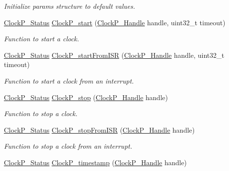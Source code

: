 \begin{DoxyCompactItemize}
\begin{DoxyCompactList}\small\item\em Initialize params structure to default values. \end{DoxyCompactList}\item 
\hyperlink{_clock_p_8h_aa2030f172fe0c2dbc9ac0b082933c767}{Clock\+P\+\_\+\+Status} \hyperlink{_clock_p_8h_a72fe821307efbdb0e314108857e39e56}{Clock\+P\+\_\+start} (\hyperlink{_clock_p_8h_a003dd74e948999fe5c3f45d8f51501f1}{Clock\+P\+\_\+\+Handle} handle, uint32\+\_\+t timeout)
\begin{DoxyCompactList}\small\item\em Function to start a clock. \end{DoxyCompactList}\item 
\hyperlink{_clock_p_8h_aa2030f172fe0c2dbc9ac0b082933c767}{Clock\+P\+\_\+\+Status} \hyperlink{_clock_p_8h_aabcc5a93edd86380d8c8dcc8cbc7781e}{Clock\+P\+\_\+start\+From\+I\+S\+R} (\hyperlink{_clock_p_8h_a003dd74e948999fe5c3f45d8f51501f1}{Clock\+P\+\_\+\+Handle} handle, uint32\+\_\+t timeout)
\begin{DoxyCompactList}\small\item\em Function to start a clock from an interrupt. \end{DoxyCompactList}\item 
\hyperlink{_clock_p_8h_aa2030f172fe0c2dbc9ac0b082933c767}{Clock\+P\+\_\+\+Status} \hyperlink{_clock_p_8h_a45b3053db24b21ebd22bc1133c40d1d0}{Clock\+P\+\_\+stop} (\hyperlink{_clock_p_8h_a003dd74e948999fe5c3f45d8f51501f1}{Clock\+P\+\_\+\+Handle} handle)
\begin{DoxyCompactList}\small\item\em Function to stop a clock. \end{DoxyCompactList}\item 
\hyperlink{_clock_p_8h_aa2030f172fe0c2dbc9ac0b082933c767}{Clock\+P\+\_\+\+Status} \hyperlink{_clock_p_8h_a355ca30df3b2152af32512db4123bae5}{Clock\+P\+\_\+stop\+From\+I\+S\+R} (\hyperlink{_clock_p_8h_a003dd74e948999fe5c3f45d8f51501f1}{Clock\+P\+\_\+\+Handle} handle)
\begin{DoxyCompactList}\small\item\em Function to stop a clock from an interrupt. \end{DoxyCompactList}\item 
\hyperlink{_clock_p_8h_aa2030f172fe0c2dbc9ac0b082933c767}{Clock\+P\+\_\+\+Status} \hyperlink{_clock_p_8h_ad54f22b1f895c689d09686b9900d75ed}{Clock\+P\+\_\+timestamp} (\hyperlink{_clock_p_8h_a003dd74e948999fe5c3f45d8f51501f1}{Clock\+P\+\_\+\+Handle} handle)
\end{DoxyCompactItemize}


